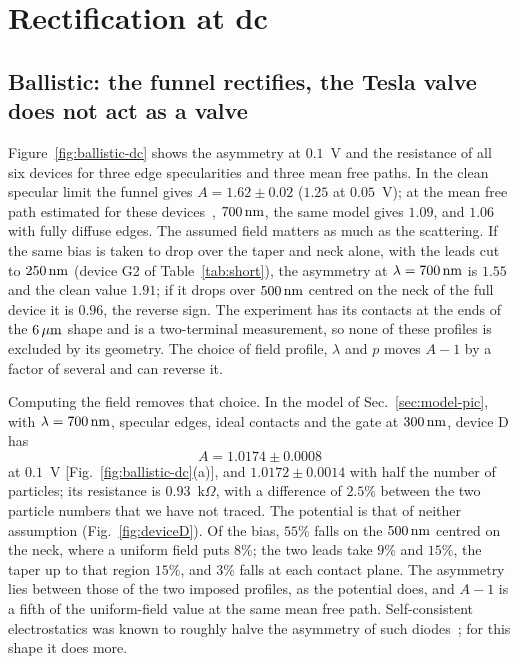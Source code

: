 \section{Rectification at dc}
\label{sec:dc}

\subsection{Ballistic: the funnel rectifies, the Tesla valve does not act as a valve}

Figure~\ref{fig:ballistic-dc} shows the asymmetry at $0.1$~V and the
resistance of all six devices for three edge specularities and three mean
free paths. In the clean specular limit the funnel gives $A=1.62\pm0.02$
($1.25$ at $0.05$~V); at the mean free path estimated for these
devices~\cite{nguyen2021geometric}, $700\,\mathrm{nm}$, the same model gives $1.09$,
and $1.06$ with fully diffuse edges. The assumed field matters as much as
the scattering. If the same bias is taken to drop over the taper and neck
alone, with the leads cut to $250\,\mathrm{nm}$ (device G2 of
Table~\ref{tab:short}), the asymmetry at $\lambda=700\,\mathrm{nm}$ is $1.55$ and
the clean value $1.91$; if it drops over $500\,\mathrm{nm}$ centred on the neck of
the full device it is $0.96$, the reverse sign. The experiment has its
contacts at the ends of the $6\,\mu\mathrm{m}$ shape and is a two-terminal
measurement, so none of these profiles is excluded by its geometry. The
choice of field profile, $\lambda$ and $p$ moves $A-1$ by a factor of
several and can reverse it.

Computing the field removes that choice. In the model of
Sec.~\ref{sec:model-pic}, with $\lambda=700\,\mathrm{nm}$, specular edges, ideal
contacts and the gate at $300\,\mathrm{nm}$, device D has
\begin{equation}
A=1.0174\pm0.0008
\label{eq:deviceD}
\end{equation}
at $0.1$~V [Fig.~\ref{fig:ballistic-dc}(a)], and $1.0172\pm0.0014$ with
half the number of particles; its resistance is $0.93$~k$\Omega$, with a
difference of $2.5\%$ between the two particle numbers that we have not
traced. The potential is that of neither assumption
(Fig.~\ref{fig:deviceD}). Of the bias, $55\%$ falls on the $500\,\mathrm{nm}$
centred on the neck, where a uniform field puts $8\%$; the two leads take
$9\%$ and $15\%$, the taper up to that region $15\%$, and $3\%$ falls at
each contact plane. The asymmetry lies between those of the two imposed
profiles, as the potential does, and $A-1$ is a fifth of the
uniform-field value at the same mean free path. Self-consistent
electrostatics was known to roughly halve the asymmetry of such
diodes~\cite{truccolo2024comprehensive}; for this shape it does more.

